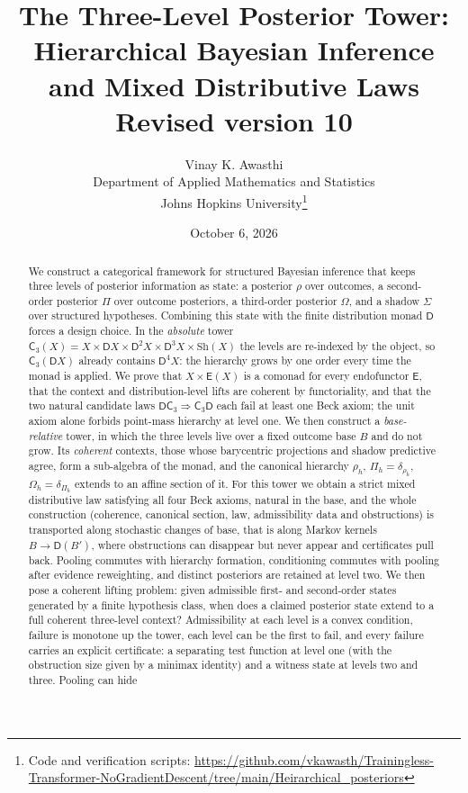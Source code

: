 \documentclass[11pt]{article}
\title{The Three-Level Posterior Tower:\\
Hierarchical Bayesian Inference and Mixed Distributive Laws\\[4pt]
\large Revised version 10}
\author{Vinay K. Awasthi\\
Department of Applied Mathematics and Statistics\\
Johns Hopkins University\thanks{Code and verification scripts:
\url{https://github.com/vkawasth/Trainingless-Transformer-NoGradientDescent/tree/main/Heirarchical_posteriors}}}
\date{October 6, 2026}
\theoremstyle{definition}
\theoremstyle{remark}
\newcommand{\D}{\mathsf{D}}
\newcommand{\Sh}{\mathrm{Sh}}
\newcommand{\C}{\mathsf{C}}
\newcommand{\E}{\mathsf{E}}
\begin{document}
\maketitle

\begin{abstract}
We construct a categorical framework for structured Bayesian inference that keeps three levels of
posterior information as state: a posterior $\rho$ over outcomes, a second-order posterior $\Pi$ over
outcome posteriors, a third-order posterior $\Omega$, and a shadow $\Sigma$ over structured hypotheses.
Combining this state with the finite distribution monad $\D$ forces a design choice. In the
\emph{absolute} tower $\C_3(X)=X\times\D X\times\D^2X\times\D^3X\times\Sh(X)$ the levels are
re-indexed by the object, so $\C_3(\D X)$ already contains $\D^4X$: the hierarchy grows by one order
every time the monad is applied. We prove that $X\times\E(X)$ is a comonad for every endofunctor $\E$,
that the context and distribution-level lifts are coherent by functoriality, and that the two natural
candidate laws $\D\C_3\Rightarrow\C_3\D$ each fail at least one Beck axiom; the unit axiom alone forbids
point-mass hierarchy at level one. We then construct a \emph{base-relative} tower, in which the three
levels live over a fixed outcome base $B$ and do not grow. Its \emph{coherent} contexts, those whose
barycentric projections and shadow predictive agree, form a sub-algebra of the monad, and the
canonical hierarchy $\rho_h$, $\Pi_h=\delta_{\rho_h}$, $\Omega_h=\delta_{\Pi_h}$ extends to an affine
section of it. For this tower we obtain a strict mixed distributive law satisfying all four Beck
axioms, natural in the base, and the whole construction (coherence, canonical section, law,
admissibility data and obstructions) is transported along stochastic changes of base, that is along
Markov kernels $B\to\D(B')$, where obstructions can disappear but never appear and certificates pull
back. Pooling commutes with hierarchy formation, conditioning commutes with
pooling after evidence reweighting, and distinct posteriors are retained at level two. We then pose a coherent lifting problem: given
admissible first- and second-order states generated by a finite hypothesis class, when does a claimed
posterior state extend to a full coherent three-level context? Admissibility at each level is a
convex condition, failure is monotone up the tower, each level can be the first to fail, and every
failure carries an explicit certificate: a separating test function at level one (with the obstruction
size given by a minimax identity) and a witness state at levels two and three. Pooling can hide

\end{abstract}
\end{document}
